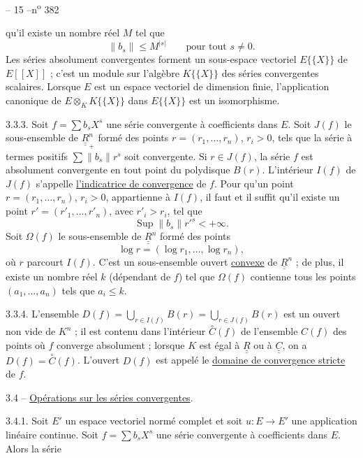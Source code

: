 \begin{center}-- 15 --\hfill n\textsuperscript{o} 382\end{center}
qu'il existe un nombre réel $M$ tel que
\[
\lVert b_s\rVert\leq M^{|s|}\qquad\text{pour tout }s\ne0.
\]
Les séries absolument convergentes forment un sous-espace vectoriel $E\{\{X\}\}$ de $E[[X]]$ ; c'est un module sur l'algèbre $K\{\{X\}\}$ des séries convergentes scalaires. Lorsque $E$ est un espace vectoriel de dimension finie, l'application canonique de $E\otimes_K K\{\{X\}\}$ dans $E\{\{X\}\}$ est un isomorphisme.

3.3.3. Soit $f=\sum b_sX^s$ une série convergente à coefficients dans $E$. Soit $J(f)$ le sous-ensemble de $\underline{\underline{R}}_+^n$ formé des points $r=(r_1,\ldots,r_n)$, $r_i>0$, tels que la série à termes positifs $\sum\lVert b_s\rVert r^s$ soit convergente. Si $r\in J(f)$, la série $f$ est absolument convergente en tout point du polydisque $B(r)$. L'intérieur $I(f)$ de $J(f)$ s'appelle \uline{l'indicatrice de convergence} de $f$. Pour qu'un point $r=(r_1,\ldots,r_n)$, $r_i>0$, appartienne à $I(f)$, il faut et il suffit qu'il existe un point $r'=(r'_1,\ldots,r'_n)$, avec $r'_i>r_i$, tel que
\[
\operatorname{Sup}\lVert b_s\rVert r'^{s}<+\infty.
\]
Soit $\Omega(f)$ le sous-ensemble de $\underline{\underline{R}}^n$ formé des points
\[
\log r=(\log r_1,\ldots,\log r_n),
\]
où $r$ parcourt $I(f)$. C'est un sous-ensemble ouvert \uline{convexe} de $\underline{\underline{R}}^n$ ; de plus, il existe un nombre réel $k$ (dépendant de $f$) tel que $\Omega(f)$ contienne tous les points $(a_1,\ldots,a_n)$ tels que $a_i\leq k$.

3.3.4. L'ensemble $D(f)=\bigcup_{r\in I(f)}B(r)=\bigcup_{r\in J(f)}B(r)$ est un ouvert non vide de $K^n$ ; il est contenu dans l'intérieur $\overset{\circ}{C}(f)$ de l'ensemble $C(f)$ des points où $f$ converge absolument ; lorsque $K$ est égal à $\underline{\underline{R}}$ ou à $\underline{\underline{C}}$, on a $D(f)=\overset{\circ}{C}(f)$. L'ouvert $D(f)$ est appelé le \uline{domaine de convergence stricte} de $f$.

3.4 -- \uline{Opérations sur les séries convergentes}.

3.4.1. Soit $E'$ un espace vectoriel normé complet et soit $u:E\longrightarrow E'$ une application linéaire continue. Soit $f=\sum b_sX^s$ une série convergente à coefficients dans $E$. Alors la série
